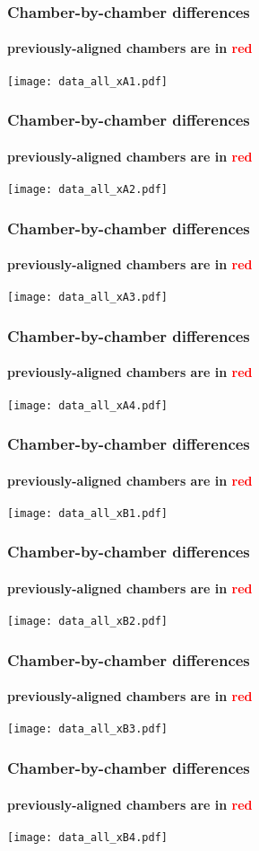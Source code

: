 \documentclass[compress]{beamer}
\begin{document}
\begin{frame}
\frametitle{Chamber-by-chamber differences}
\framesubtitle{previously-aligned chambers are in \textcolor{red}{red}}
\texttt{[image: data\_all\_xA1.pdf]}
\end{frame}

\begin{frame}
\frametitle{Chamber-by-chamber differences}
\framesubtitle{previously-aligned chambers are in \textcolor{red}{red}}
\texttt{[image: data\_all\_xA2.pdf]}
\end{frame}

\begin{frame}
\frametitle{Chamber-by-chamber differences}
\framesubtitle{previously-aligned chambers are in \textcolor{red}{red}}
\texttt{[image: data\_all\_xA3.pdf]}
\end{frame}

\begin{frame}
\frametitle{Chamber-by-chamber differences}
\framesubtitle{previously-aligned chambers are in \textcolor{red}{red}}
\texttt{[image: data\_all\_xA4.pdf]}
\end{frame}

\begin{frame}
\frametitle{Chamber-by-chamber differences}
\framesubtitle{previously-aligned chambers are in \textcolor{red}{red}}
\texttt{[image: data\_all\_xB1.pdf]}
\end{frame}

\begin{frame}
\frametitle{Chamber-by-chamber differences}
\framesubtitle{previously-aligned chambers are in \textcolor{red}{red}}
\texttt{[image: data\_all\_xB2.pdf]}
\end{frame}

\begin{frame}
\frametitle{Chamber-by-chamber differences}
\framesubtitle{previously-aligned chambers are in \textcolor{red}{red}}
\texttt{[image: data\_all\_xB3.pdf]}
\end{frame}

\begin{frame}
\frametitle{Chamber-by-chamber differences}
\framesubtitle{previously-aligned chambers are in \textcolor{red}{red}}
\texttt{[image: data\_all\_xB4.pdf]}
\end{frame}
\end{document}
